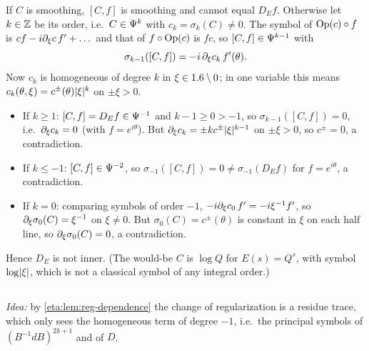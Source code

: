 If $C$ is smoothing, $[C,f]$ is smoothing and cannot equal $D_Ef$. Otherwise let
$k\in\mathbb{Z}$ be its order, i.e.\ $C\in\Psi^{k}$ with $c_k=\sigma_k(C)\ne0$. The
symbol of $\operatorname{Op}(c)\circ f$ is $cf-i\partial_\xi c\,f'+\dots$ and that of $f\circ\operatorname{Op}(c)$ is
$fc$, so $[C,f]\in\Psi^{k-1}$ with
\begin{equation*}
  \sigma_{k-1}([C,f])=-i\,\partial_\xi c_k\,f'(\theta).
\end{equation*}
Now $c_k$ is homogeneous of degree $k$ in $\xi\in1.6\setminus0$; in one variable this
means $c_k(\theta,\xi)=c^\pm(\theta)\lvert \xi\rvert^k$ on $\pm\xi>0$.
\begin{itemize}
\item If $k\ge1$: $[C,f]=D_Ef\in\Psi^{-1}$ and $k-1\ge0>-1$, so
  $\sigma_{k-1}([C,f])=0$, i.e.\ $\partial_\xi c_k=0$ (with $f=e^{i\theta}$). But
  $\partial_\xi c_k=\pm kc^\pm\lvert \xi\rvert^{k-1}$ on $\pm\xi>0$, so $c^\pm=0$, a contradiction.
\item If $k\le-1$: $[C,f]\in\Psi^{-2}$, so $\sigma_{-1}([C,f])=0\ne\sigma_{-1}(D_Ef)$
  for $f=e^{i\theta}$, a contradiction.
\item If $k=0$: comparing symbols of order $-1$, $-i\partial_\xi c_0\,f'=-i\xi^{-1}f'$, so
  $\partial_\xi\sigma_0(C)=\xi^{-1}$ on $\xi\ne0$. But $\sigma_0(C)=c^\pm(\theta)$ is
  constant in $\xi$ on each half line, so $\partial_\xi\sigma_0(C)=0$, a contradiction.
\end{itemize}
Hence $D_E$ is not inner. (The would-be $C$ is $\log Q$ for $E(s)=Q^s$, with
symbol $\log\lvert \xi\rvert$, which is not a classical symbol of any integral order.)

\subsection*{}

\emph{Idea:} by \cref{eta:lem:reg-dependence} the change of regularization is a
residue trace, which only sees the homogeneous term of degree $-1$, i.e.\ the
principal symbols of $(B^{-1}dB)^{2k+1}$ and of $D$.

